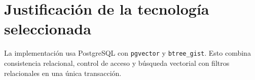 \section{Justificación de la tecnología seleccionada}
La implementación usa PostgreSQL con \texttt{pgvector} y \texttt{btree\_gist}. Esto combina consistencia relacional, control de acceso y búsqueda vectorial con filtros relacionales en una única transacción.
